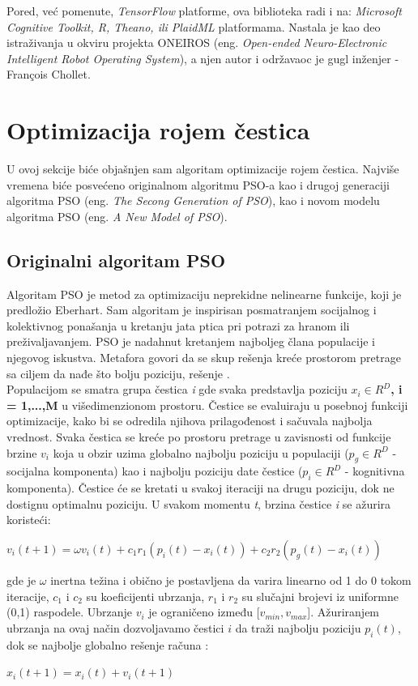 \documentclass[a4paper]{article}
\begin{document}
Pored, već pomenute, \textit{TensorFlow} platforme, ova biblioteka radi i na: \textit{Microsoft Cognitive Toolkit, R, Theano, ili PlaidML} platformama. 
Nastala je kao deo istraživanja u okviru projekta ONEIROS (eng. \emph{Open-ended Neuro-Electronic Intelligent Robot Operating System}), 
a njen autor i održavaoc je gugl inženjer -  François Chollet.

\section{Optimizacija rojem čestica}
\label{subsec:pso}
U ovoj sekcije biće objašnjen sam algoritam optimizacije rojem čestica. Najviše vremena biće posvećeno originalnom algoritmu PSO-a kao i drugoj generaciji algoritma PSO (eng. \textit{The Secong Generation of PSO}), kao i novom modelu algoritma PSO 
(eng. \textit{A New Model of PSO}).


\subsection{Originalni algoritam PSO}
\label{subsec:opso}
Algoritam PSO je metod za optimizaciju neprekidne nelinearne funkcije, koji je predložio Eberhart.
Sam algoritam je inspirisan posmatranjem socijalnog i kolektivnog ponašanja u kretanju jata ptica pri potrazi za hranom ili preživaljavanjem.
PSO je nadahnut kretanjem najboljeg člana populacije i njegovog iskustva. Metafora govori da se skup rešenja kreće prostorom pretrage 
sa ciljem da nađe što bolju poziciju, rešenje \cite{hindawi}.
\\
Populacijom se smatra grupa čestica \textit{i} gde svaka predstavlja poziciju \textbf{\textbf{$x_i \in R^D$, i = 1,...,M}} u višedimenzionom prostoru.
Čestice se evaluiraju u posebnoj funkciji optimizacije, kako bi se odredila njihova prilagođenost i sačuvala najbolja vrednost. Svaka čestica se kreće po
prostoru pretrage u zavisnosti od funkcije brzine \textbf{$v_i$} koja u obzir uzima globalno najbolju poziciju u populaciji ($p_g \in R^D$ - socijalna
komponenta) kao i najbolju poziciju date čestice ($p_i \in R^D$ - kognitivna komponenta). Čestice će se kretati u svakoj iteraciji na drugu poziciju,
dok ne dostignu optimalnu poziciju. U svakom momentu \textit{t}, brzina čestice \textit{i} se ažurira koristeći: 
\begin{center}
\textbf\textit{$v_i(t+1) = \omega v_i(t) + c_1 r_1(p_i (t) - x_i (t)) + c_2 r_2 (p_g (t) - x_i (t))$}
\end{center}
gde je $\omega$ inertna težina i obično je postavljena da varira linearno od 1 do 0 tokom iteracije, $c_1$ i $c_2$ su koeficijenti ubrzanja, $r_1$ i $r_2$
su slučajni brojevi iz uniformne (0,1) raspodele. Ubrzanje \textbf{$v_i$} je ograničeno između [$v_{min}, v_{max}$]. Ažuriranjem ubrzanja na ovaj 
način dozvoljavamo čestici $i$ da traži najbolju poziciju \textbf{$p_i(t)$}, dok se najbolje globalno rešenje računa \cite{hindawi}:
\begin{center}
\textbf\textit{$x_i(t+1) = x_i(t) + v_i(t+1)$}
\end{center} 
\end{document}
